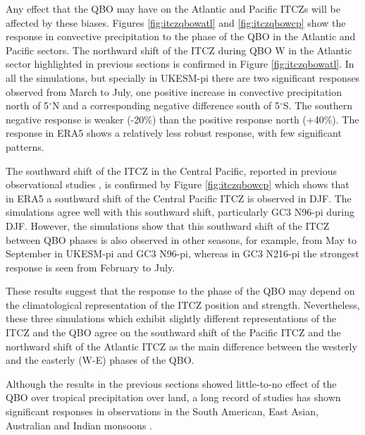 Any effect that the QBO may have on the Atlantic and Pacific ITCZs will be affected by these biases. 
Figures \ref{fig:itczqbowatl} and \ref{fig:itczqbowcp} show the response in convective precipitation to the phase of the QBO in the Atlantic and Pacific sectors. 
The northward shift of the ITCZ during QBO W in the Atlantic sector highlighted in previous sections is confirmed in Figure \ref{fig:itczqbowatl}. In all the simulations, but specially in UKESM-pi there are two significant responses observed from March to July, one positive increase in convective precipitation north of 5$^\circ$N and a corresponding negative difference south of 5$^\circ
$S. The southern negative response is weaker (-20\%) than the positive response north (+40\%). 
The response in ERA5 shows a relatively less robust response, with few significant patterns. %

The southward shift of the ITCZ in the Central Pacific, reported in previous observational studies \citep{gray2018}, is confirmed by Figure \ref{fig:itczqbowcp} which shows that in ERA5 a southward shift of the Central Pacific ITCZ is observed in DJF. 
The simulations agree well with this southward shift, particularly GC3 N96-pi during DJF. However, the simulations show that this southward shift of the ITCZ between QBO phases is also observed in other seasons, for example, from May to September in UKESM-pi and GC3 N96-pi, whereas in GC3 N216-pi the strongest response is seen from February to July.


These results suggest that the response to the phase of the QBO may depend on the climatological representation of the ITCZ position and strength. Nevertheless, these three simulations which exhibit slightly different representations of the ITCZ and the QBO agree on the southward shift of the Pacific ITCZ and the northward shift of the Atlantic ITCZ as the main difference between the westerly and the easterly (W-E) phases of the QBO. 

Although the results in the previous sections showed little-to-no effect of the QBO over tropical precipitation over land, a long record of studies has shown significant responses in observations in the South American, East Asian, Australian and Indian monsoons \citep{giorgetta1999,collimore2003,liess2012,gray2018}. 



